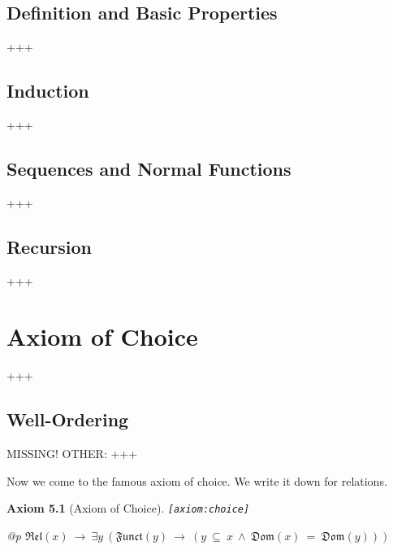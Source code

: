 \documentclass[a4paper,german,10pt,twoside]{book}
\newtheorem{ax}{Axiom}
\theoremstyle{definition}
\theoremstyle{remark}
\begin{document}
\section{Definition and Basic Properties} \label{chapter6_section2} \hypertarget{chapter6_section2}{}
+++

\section{Induction} \label{chapter6_section3} \hypertarget{chapter6_section3}{}
+++

\section{Sequences and Normal Functions} \label{chapter6_section4} \hypertarget{chapter6_section4}{}
+++

\section{Recursion} \label{chapter6_section5} \hypertarget{chapter6_section5}{}
+++



\chapter{Axiom of Choice} \label{chapter7} \hypertarget{chapter7}{}

+++

\section{Well-Ordering} \label{chapter7_section1} \hypertarget{chapter7_section1}{}
MISSING! OTHER: +++

\par
Now we come to the famous axiom of choice. We write it down for relations.

\begin{ax}[Axiom of Choice]
\label{axiom:choice} \hypertarget{axiom:choice}{}
{\tt \tiny [\verb]axiom:choice]]}
\mbox{}
\begin{longtable}{{@{\extracolsep{\fill}}p{\linewidth}}}
\centering $\mathfrak{Rel}(x)\ \rightarrow\ \exists y\ (\mathfrak{Funct}(y)\ \rightarrow\ (y \ \subseteq \ x\ \land\ \mathfrak{Dom}(x) \ = \ \mathfrak{Dom}(y)))$
\end{longtable}

\end{ax}
\end{document}
